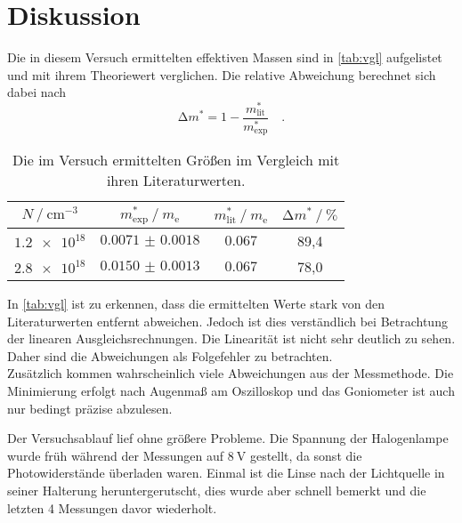 \newpage
\section{Diskussion}

\noindent Die in diesem Versuch ermittelten effektiven Massen sind in \autoref{tab:vgl} aufgelistet und mit ihrem Theoriewert verglichen. 
Die relative Abweichung berechnet sich dabei nach
\begin{equation*}
    \increment m^* = 1 - \frac{m^*_\text{lit}}{m^*_\text{exp}} \quad .
\end{equation*}

\begin{table}
    \centering
    \caption{Die im Versuch ermittelten Größen im Vergleich mit ihren Literaturwerten.}
    \label{tab:vgl}
    \begin{tabular}{c c c c}
        \toprule
        {$N \mathbin{/} \si{\centi\metre\tothe{-3}}$} & {$m^*_\text{exp} \mathbin{/} m_\text{e}$} & {$m^*_\text{lit} \mathbin{/} m_\text{e}$ \protect \cite{effmasse}} & {$\increment m^* \mathbin{/} \si{\percent}$}\\ 
        \midrule
        $\num{1.2e18}$ & $\num{0.0071(18)}$ & $\num{0.067}$ & 89,4 \\
        $\num{2.8e18}$ & $\num{0.0150(13)}$ & $\num{0.067}$ & 78,0 \\
        \bottomrule
    \end{tabular}
\end{table}

\noindent In \autoref{tab:vgl} ist zu erkennen, dass die ermittelten Werte stark von den Literaturwerten entfernt abweichen. Jedoch ist dies verständlich bei 
Betrachtung der linearen Ausgleichsrechnungen. Die Linearität ist nicht sehr deutlich zu sehen. Daher sind die Abweichungen als Folgefehler zu betrachten. \\
Zusätzlich kommen wahrscheinlich viele Abweichungen aus der Messmethode. Die Minimierung erfolgt nach Augenmaß am Oszilloskop und das Goniometer ist auch nur 
bedingt präzise abzulesen.

\noindent Der Versuchsablauf lief ohne größere Probleme. Die Spannung der Halogenlampe wurde früh während der Messungen auf $\SI{8}{\volt}$ gestellt, da sonst die 
Photowiderstände überladen waren. Einmal ist die Linse nach der Lichtquelle in seiner Halterung heruntergerutscht, dies wurde aber schnell bemerkt und die 
letzten 4 Messungen davor wiederholt.
